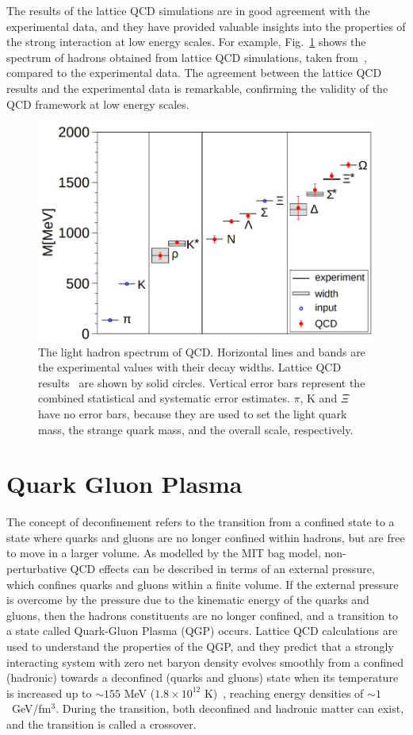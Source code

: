 The results of the lattice QCD simulations are in good agreement with the experimental data, and they have provided valuable insights into the properties of the strong interaction at low energy scales. For example, Fig.~\ref{fig:LQCD_hadron_mass} shows the spectrum of hadrons obtained from lattice QCD simulations, taken from~\cite{BMW:2008jgk}, compared to the experimental data. The agreement between the lattice QCD results and the experimental data is remarkable, confirming the validity of the QCD framework at low energy scales.
\begin{figure}[t!]
  \centering
  \includegraphics[width=0.7\linewidth]{Figures/Chapter 1/LQCD_hadron_mass.png}
  \caption{The light hadron spectrum of QCD. Horizontal lines and bands are the experimental values with their decay widths. Lattice QCD results~\cite{BMW:2008jgk} are shown by solid circles. Vertical error bars represent the combined statistical and systematic error estimates. $\pi$, K and $\Xi$ have no error bars, because they are used to set the light quark mass, the strange quark mass, and the overall scale, respectively.}
  \label{fig:LQCD_hadron_mass}
\end{figure}

\section{Quark Gluon Plasma}
The concept of deconfinement refers to the transition from a confined state to a state where quarks and gluons are no longer confined within hadrons, but are free to move in a larger volume. As modelled by the MIT bag model, non-perturbative QCD effects can be described in terms of an external pressure, which confines quarks and gluons within a finite volume. If the external pressure is overcome by the pressure due to the kinematic energy of the quarks and gluons, then the hadrons constituents are no longer confined, and a transition to a state called Quark-Gluon Plasma (QGP) occurs. Lattice QCD calculations are used to understand the properties of the QGP, and they predict that a strongly interacting system with zero net baryon density evolves smoothly from a confined (hadronic) towards a deconfined (quarks and gluons) state when its temperature is increased up to $\sim155$ MeV ($1.8\times 10^12$ K)~\cite{HotQCD:2014kol, Borsanyi:2013bia}, reaching energy densities of $\sim 1$~GeV/fm$^3$. During the transition, both deconfined and hadronic matter can exist, and the transition is called a crossover.


